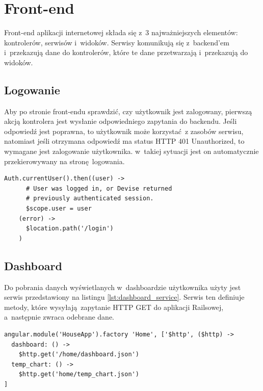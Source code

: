 \documentclass[eng,oneside]{mgr}
\begin{document}
\section{Front-end} %
\label{sec:front_end}
Front-end aplikacji internetowej składa się z~3 najważniejszych elementów: kontrolerów, serwisów i~widoków. Serwisy komunikują się z~backend'em i~przekazują dane do kontrolerów, które te dane przetwarzają i~przekazują do widoków.
\subsection{Logowanie} %
\label{sub:logowanie}
Aby po stronie front-endu sprawdzić, czy użytkownik jest zalogowany, pierwszą akcją kontrolera jest wysłanie odpowiedniego zapytania do backendu. Jeśli odpowiedź jest poprawna, to użytkownik może korzystać z zasobów serwisu, natomiast jeśli otrzymana odpowiedź ma status HTTP 401 Unauthorized, to wymagane jest zalogowanie użytkownika. w~takiej sytuacji jest on automatycznie przekierowywany na stronę logowania.
\begin{lstlisting}[caption={Sprawdzenie czy użytkownik jest zalogowany.}, label=lst:front_login]
Auth.currentUser().then((user) ->
      # User was logged in, or Devise returned
      # previously authenticated session.
      $scope.user = user
    (error) ->
      $location.path('/login')
    )
\end{lstlisting}
\subsection{Dashboard} %
\label{sub:dashboard}
Do pobrania danych wyświetlanych w~dashboardzie użytkownika użyty jest serwis przedstawiony na listingu \ref{lst:dashboard_service}. Serwis ten definiuje metody, które wysyłają zapytanie HTTP GET do aplikacji Railsowej, a~następnie zwraca odebrane dane.
\begin{lstlisting}[caption={Serwis dashboardu.},label=lst:dashboard_service]
angular.module('HouseApp').factory 'Home', ['$http', ($http) ->
  dashboard: () ->
    $http.get('/home/dashboard.json')
  temp_chart: () ->
    $http.get('home/temp_chart.json')
]
\end{lstlisting}
\end{document}

